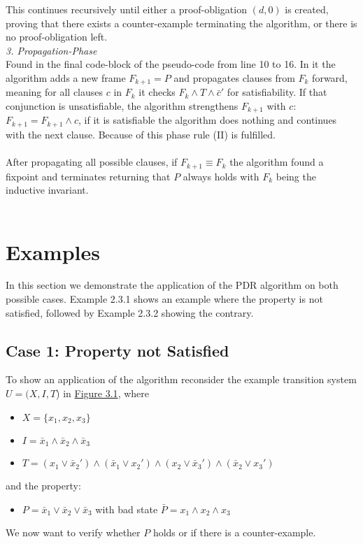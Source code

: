 \documentclass[11pt, a4paper, BCOR=10mm, ngerman]{scrbook}
\begin{document}
This continues recursively until either a proof-obligation $(d, 0)$ is created, proving that there exists a counter-example terminating the algorithm, or
there is no proof-obligation left. \\

\textsl{3. Propagation-Phase}\\ Found in the final code-block of the pseudo-code from line 10 to 16. In it the algorithm adds a new frame $F_{k + 1} = P$ and propagates clauses from $F_{k}$ forward, meaning for all clauses $c$ in $F_{k}$ it checks $F_{k} \land T \land \bar c'$ for satisfiability. If that conjunction is unsatisfiable, the algorithm strengthens $F_{k+1}$ with $c$: $F_{k+1} = F_{k+1} \land c$, if it is satisfiable the algorithm does nothing and continues with the next clause. Because of this phase rule (II) is fulfilled.\\ \\
After propagating all possible clauses, if $F_{k+1} \equiv F_{k}$ the algorithm found a fixpoint and terminates returning that $P$ always holds with $F_k$ being the inductive invariant. \\ \\

\pagebreak

\section{Examples}

In this section we demonstrate the application of the PDR algorithm on both possible cases. Example 2.3.1 shows an example where the property is not satisfied, followed by Example 2.3.2 showing the contrary.
 
\subsection{Case 1: Property not Satisfied} 
To show an application of the algorithm reconsider the example transition system $U = (X, I, T$) in \hyperref[ex1]{Figure 3.1}, where \par
\begin{itemize}
\item $X = \{x_1, x_2, x_3\}$
\item $I = \bar x_1 \land \bar x_2 \land \bar x_3$
\item $T = (x_1 \lor \bar x_2' ) \land ( \bar x_1 \lor x_2') \land (x_2 \lor \bar x_3') \land ( \bar x_2 \lor x_3')$
\end{itemize}
and the property: 
\begin{itemize}
\item $P = \bar x_1 \lor \bar x_2 \lor \bar x_3$ with bad state $\bar P = x_1 \land x_2 \land x_3$ 
\end{itemize}
We now want to verify whether $P$ holds or if there is a counter-example. \\ \\
\end{document}
